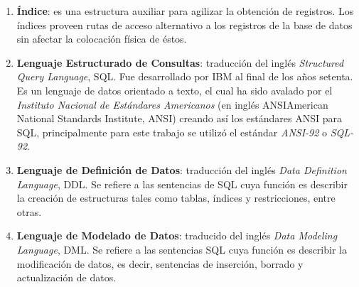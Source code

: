 \begin{enumerate}
	\item \textbf{Índice}: es una estructura auxiliar para agilizar la obtención de registros. Los índices proveen rutas de acceso alternativo a los registros de la base de datos sin afectar la colocación física de éstos\cite{FundamentalsOfDBSystems}.
	\item \textbf{Lenguaje Estructurado de Consultas}: traducción del inglés \textit{Structured Query Language}, SQL. Fue desarrollado por IBM\textsuperscript{\textcopyright} al final de los años setenta. Es un lenguaje de datos orientado a texto, el cual ha sido avalado por el \textit{Instituto Nacional de Estándares Americanos} (en inglés ANSI{American National Standards Institute}, ANSI) creando así los estándares ANSI para SQL, principalmente para este trabajo se utilizó el estándar \textit{ANSI-92} o \textit{SQL-92}.
	\item \textbf{Lenguaje de Definición de Datos}: traducción del inglés \textit{Data Definition Language}, DDL. Se refiere a las sentencias de SQL cuya función es describir la creación de estructuras tales como tablas, índices y restricciones, entre otras\cite{DataBaseConcepts}.
	\item \textbf{Lenguaje de Modelado de Datos}: traducido del inglés \textit{Data Modeling Language}, DML. Se refiere a las sentencias SQL cuya función es describir la modificación de datos, es decir, sentencias de inserción, borrado y actualización de datos\cite{DataBaseConcepts}.  
\end{enumerate}

